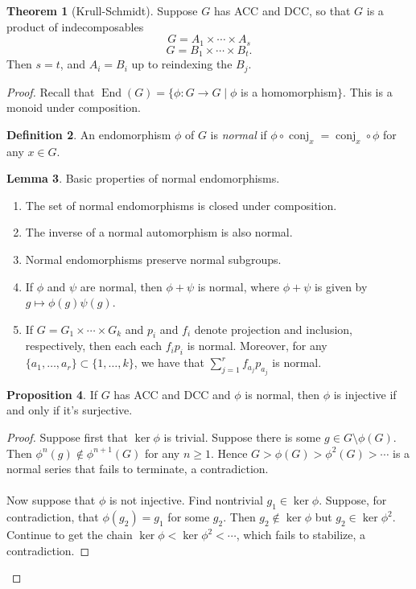 \documentclass[10pt,letterpaper,cm]{nupset}
\theoremstyle{definition}
\newtheorem{definition}{Definition}[subsection]
\theoremstyle{theorem}
\newtheorem{theorem}[definition]{Theorem}
\newtheorem{lemma}[definition]{Lemma}
\newtheorem{prop}[definition]{Proposition}
\theoremstyle{remark}
\newcommand{\1}{\mathbf{1}}
\newcommand{\0}{\vec 0}
\DeclareMathOperator{\conj}{conj}
\DeclareMathOperator{\ed}{End}
\begin{document}
\begin{theorem}[Krull-Schmidt]
Suppose $G$ has ACC and DCC, so that $G$ is a product of indecomposables $$G = A_1 \times \cdots \times A_s$$ $$G = B_1 \times \cdots \times B_t.$$ Then $s=t$, and $A_i = B_i$ up to reindexing the $B_j$.
\end{theorem}
\begin{proof}
Recall that $\ed(G) = \{\phi : G \to G \mid \phi$ is a homomorphism$\}$. This is a monoid under composition.
\begin{definition}
An endomorphism $\phi$ of $G$ is \textit{normal} if $\phi \circ \conj_x = \conj_x \circ \phi$ for any $x\in G$.
\end{definition}
\begin{lemma} Basic properties of normal endomorphisms.
\begin{enumerate}
\item The set of normal endomorphisms is closed under composition.
\item The inverse of a normal automorphism is also normal.
\item Normal endomorphisms preserve normal subgroups.
\item If $\phi$ and $\psi$ are normal, then $\phi + \psi$ is normal, where $\phi + \psi$ is given by $g\mapsto \phi(g)\psi(g)$.
\item If $G = G_1 \times \cdots \times G_k$ and $p_i$ and $f_i$ denote projection and inclusion, respectively, then each each $f_ip_i$ is normal. Moreover, for any $\{a_1, \ldots, a_r\} \subset \{1, \ldots, k\}$, we have that $\sum_{j=1}^r f_{a_j}p_{a_j}$ is normal.
\end{enumerate}
\end{lemma}
\begin{prop}
If $G$ has ACC and DCC and $\phi$ is normal, then $\phi$ is injective if and only if it's surjective.
\end{prop}
\begin{proof}
Suppose first that $\ker \phi$ is trivial. Suppose there is some $g \in G \setminus \phi(G)$.  Then $\phi^n(g) \notin \phi^{n+1}(G)$ for any $n \geq 1$. Hence $G > \phi(G) > \phi^2(G) > \cdots$ is a normal series that fails to terminate, a contradiction. \\ \\ Now suppose that $\phi$ is not injective. Find nontrivial $g_1 \in \ker \phi$. Suppose, for contradiction, that $\phi(g_2) = g_1$ for some $g_2$. Then $g_2 \notin \ker \phi$ but $g_2 \in \ker \phi^2$. Continue to get the chain $\ker \phi < \ker \phi^2 < \cdots$, which fails to stabilize, a contradiction. 
\end{proof}


\end{proof}
\end{document}
